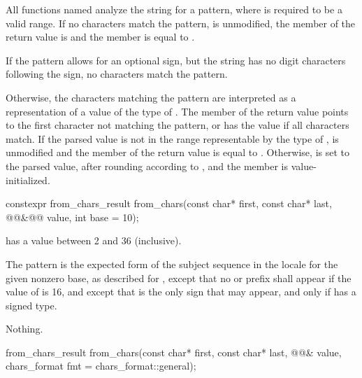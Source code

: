 \pnum
All functions named 
analyze the string 
for a pattern,
where  is required to be a valid range.
If no characters match the pattern,
 is unmodified,
the member  of the return value is  and
the member  is equal to .
\begin{note}
If the pattern allows for an optional sign,
but the string has no digit characters following the sign,
no characters match the pattern.
\end{note}
Otherwise,
the characters matching the pattern
are interpreted as a representation
of a value of the type of .
The member 
of the return value
points to the first character
not matching the pattern,
or has the value 
if all characters match.
If the parsed value
is not in the range
representable by the type of ,
 is unmodified and
the member  of the return value
is equal to .
Otherwise,
 is set to the parsed value,
after rounding according to , and
the member  is value-initialized.

%
\begin{itemdecl}
constexpr from_chars_result from_chars(const char* first, const char* last,
                                       @@&@\itcorr[-1]@ value, int base = 10);
\end{itemdecl}

\begin{itemdescr}
\pnum
\expects
{} has a value between 2 and 36 (inclusive).

\pnum
\effects
The pattern is the expected form of the subject sequence
in the  locale
for the given nonzero base,
as described for ,
except that no  or  prefix shall appear
if the value of  is 16,
and except that 
is the only sign that may appear,
and only if  has a signed type.

\pnum
\throws
Nothing.
\end{itemdescr}

%
\begin{itemdecl}
from_chars_result from_chars(const char* first, const char* last, @@& value,
                             chars_format fmt = chars_format::general);
\end{itemdecl}

